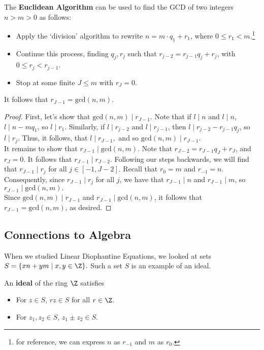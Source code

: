 \documentclass[11pt]{article}
\begin{document}
\begin{theorem}
The \textbf{Euclidean Algorithm} can be used to find the GCD of two integers $n > m > 0$ as follows:
\begin{itemize}
    \item Apply the `division' algorithm to rewrite $n = m \cdot q_1 + r_1$, where $0 \leq r_1 < m$.\footnote{for reference, we can express $n$ as $r_{-1}$ and $m$ as $r_0$.}
    \item Continue this process, finding $q_j, r_j$ such that $r_{j-2} = r_{j-1} q_j + r_j$, with $0 \leq r_j < r_{j-1}$.
    \item Stop at some finite $J \leq m$ with $r_J = 0$.
\end{itemize}

It follows that $r_{J-1} = \mathrm{gcd}(n, m).$ 
\end{theorem}

\begin{proof}
First, let's show that $\mathrm{gcd}(n, m) \mid r_{J-1}.$ Note that if $l \mid n$ and $l \mid n$, $l \mid n - mq_1$, so $l \mid r_1$. Similarly, if 
$l \mid r_{j-2}$ and $l \mid r_{j-1}$, then $l \mid r_{j-2} - r_{j-1}q_j$, so $l \mid r_j$. Thus, it follows, that $l \mid r_{J-1},$ and so $\mathrm{gcd}(n, m) \mid r_{J-1}.$ \\

It remains to show that $r_{J-1} \mid \mathrm{gcd}(n, m)$. Note that
$r_{J-2} = r_{J-1}q_{J} + r_J$, and $r_J = 0$. It follows that $r_{J-1} \mid r_{J-2}$. Following our steps backwards, 
we will find that $r_{J-1} \mid r_j$ for all $j \in [-1, J-2].$ 
Recall that $r_0 = m$ and $r_{-1} = n$. Consequently, since $r_{J-1} \mid r_j$ for all $j$, we have that $r_{J-1} \mid n$ and $r_{J-1} \mid m$, so $r_{J-1} \mid \mathrm{gcd}(n, m).$ \\

Since $\mathrm{gcd}(n, m) \mid r_{J-1}$ and $r_{J-1} \mid \mathrm{gcd}(n, m)$, it follows that $r_{J-1} = \mathrm{gcd}(n, m)$, as desired. 
\end{proof}

\subsection{Connections to Algebra}
When we studied Linear Diophantine Equations, we looked at sets $S = \{ xn + ym \mid x, y \in \Z \}.$ Such a set $S$ is an example of an ideal.
\begin{definition}[Ideals]
An \textbf{ideal} of the ring $\Z$ satisfies
\begin{itemize}
    \item For $z \in S$, $rz \in S$ for all $r \in \Z$.
    \item For $z_1, z_2 \in S$, $z_1 \pm z_2 \in S$.
\end{itemize}
\end{definition} 
\end{document}
